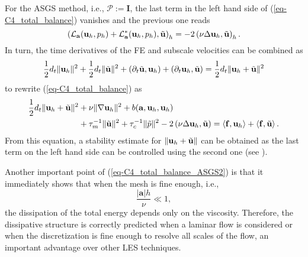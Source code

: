 For the ASGS method, i.e., $\mathcal{P}:=\mathbf{I}$, the last term in the left hand side of (\ref{eq-C4_total_balance}) vanishes and the previous one reads
\begin{equation}
\left(\mathcal{L}_{{\bf a}}({\bf u}_h,p_h)+\mathcal{L}^*_{{\bf a}}({\bf u}_h,p_h),\tilde{{\bf u}}\right)_h=
-2 \left(\nu\Delta{\bf u}_h,\tilde{{\bf u}}\right)_h.
\end{equation}
In turn, the time derivatives of the FE and subscale velocities can be combined as
\begin{align}
\label{eq-C4_time_deriv_ASGS}
\frac{1}{2}d_t\|{\bf u}_h\|^2+\frac{1}{2}d_t\|\tilde{{\bf u}}\|^2+(\partial_t\tilde{{\bf u}},{\bf u}_h)+\left(\partial_t{\bf u}_h,\tilde{{\bf u}}\right)=\frac{1}{2}d_t\|{\bf u}_h+\tilde{{\bf u}}\|^2
\end{align}
to rewrite (\ref{eq-C4_total_balance}) as
\begin{align}
\label{eq-C4_total_balance_ASGS2}
\frac{1}{2}d_t\|{\bf u}_h+\tilde{{\bf u}}\|^2
&+\nu\|\nabla{\bf u}_h\|^2+b({\bf a},{\bf u}_h,{\bf u}_h) \\ \nonumber
&+\tau_m^{-1}\|\tilde{{\bf u}}\|^2+\tau_c^{-1}\|\tilde{p}\|^2-2 \left(\nu\Delta{\bf u}_h,\tilde{{\bf u}}\right)=\left<\mathbf{f},\mathbf{u}_h\right>+\left<\mathbf{f},\tilde{{\bf u}}\right>.
\end{align}
From this equation, a stability estimate for $\|{\bf u}_h+\tilde{{\bf u}}\|$ can be obtained as the last term on the left hand side can be controlled using the second one (see \cite[Remark 4.7]{Badia2009a}).%

Another important point of (\ref{eq-C4_total_balance_ASGS2}) is that it immediately shows that when the mesh is fine enough, i.e., 
\begin{equation*}
\frac{\left| \mathbf{a}\right| h}{\nu }\ll 1,
\end{equation*}
the dissipation of the total energy depends only on the viscosity. Therefore, the dissipative structure is correctly predicted when a laminar flow is considered or when the discretization is fine enough to resolve all scales of the flow, an important advantage over other LES techniques.

